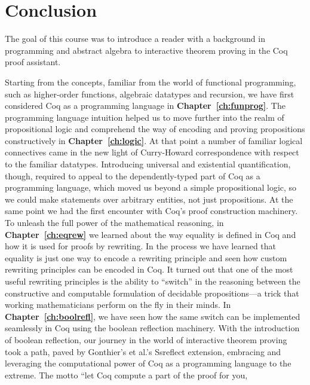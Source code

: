\begin{coqdoccode}
\coqdocemptyline
\end{coqdoccode}

\chapter{Conclusion}
\label{ch:conclusion}

The goal of this course was to introduce a reader with a background in
programming and abstract algebra to interactive theorem proving in the
Coq proof assistant.

Starting from the concepts, familiar from the world of functional
programming, such as higher-order functions, algebraic datatypes and
recursion, we have first considered Coq as a programming language in
\textbf{Chapter~\ref{ch:funprog}}. The programming language intuition
helped us to move further into the realm of propositional logic and
comprehend the way of encoding and proving propositions constructively
in \textbf{Chapter~\ref{ch:logic}}. At that point a number of familiar
logical connectives came in the new light of Curry-Howard
correspondence with respect to the familiar datatypes. Introducing
universal and existential quantification, though, required to appeal
to the dependently-typed part of Coq as a programming language, which moved
us beyond a simple propositional logic, so we could make statements
over arbitrary entities, not just propositions. At the same point we
had the first encounter with Coq's proof construction machinery. To
unleash the full power of the mathematical reasoning, in
\textbf{Chapter~\ref{ch:eqrew}} we learned about the way equality is
defined in Coq and how it is used for proofs by rewriting. In the
process we have learned that equality is just one way to encode a
rewriting principle and seen how custom rewriting principles can be
encoded in Coq. It turned out that one of the most useful rewriting
principles is the ability to ``switch'' in the reasoning between the
constructive and computable formulation of decidable propositions---a
trick that working mathematicians perform on the fly in their
minds. In \textbf{Chapter~\ref{ch:boolrefl}}, we have seen how the
same switch can be implemented seamlessly in Coq using the boolean
reflection machinery.  With the introduction of boolean reflection,
our journey in the world of interactive theorem proving took a path,
paved by Gonthier's et al.'s Ssreflect extension, embracing and
leveraging the computational power of Coq as a programming language to
the extreme. The motto ``let Coq compute a part of the proof for you,
